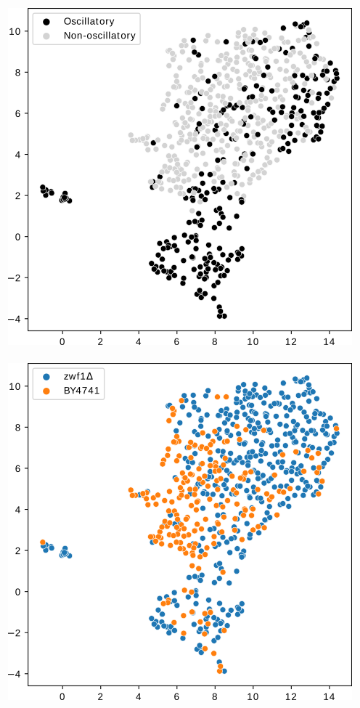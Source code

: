 \begin{figure}
  \centering
  \begin{subfigure}[t]{0.5\textwidth}
  \centering
    \includegraphics[width=\linewidth]{umap_single_is20016_2_edit.png}
    \caption{
    }
    \label{fig:umap-osc}
  \end{subfigure}%
  \begin{subfigure}[t]{0.5\textwidth}
  \centering
    \includegraphics[width=\linewidth]{umap_single_is20016_1_edit.png}
    \caption{
    }
    \label{fig:umap-strain}
  \end{subfigure}


\end{figure}
